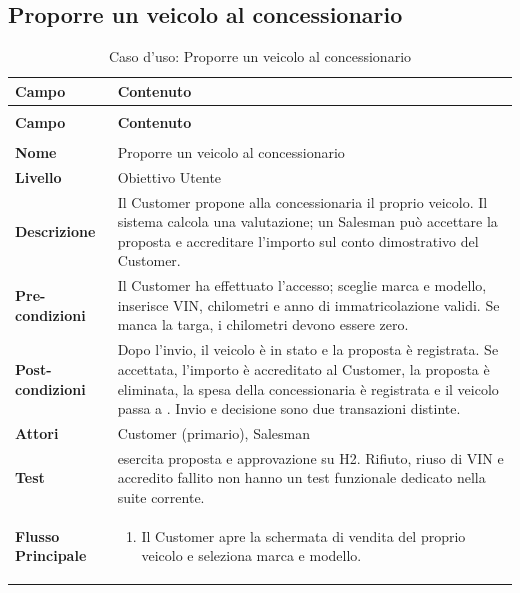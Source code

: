 \subsection{Proporre un veicolo al concessionario}\label{sec:uc-cessione}
\begin{xltabular}{\textwidth}{| >{\bfseries}p{.22\textwidth} | >{\raggedright\arraybackslash}X |}
\caption{Caso d'uso: Proporre un veicolo al concessionario}\label{tab:uc-cessione}\\
\hline
{} Campo & \textbf{Contenuto}\\\hline
\endfirsthead
{}\\
\hline
{} Campo & \textbf{Contenuto}\\\hline
\endhead
\hline
{}\\
\endfoot
\endlastfoot
Nome & Proporre un veicolo al concessionario\\\hline
Livello & Obiettivo Utente\\\hline
Descrizione & Il Customer propone alla concessionaria il proprio veicolo. Il sistema calcola una valutazione; un Salesman può accettare la proposta e accreditare l'importo sul conto dimostrativo del Customer.\\\hline
Pre-condizioni & Il Customer ha effettuato l'accesso; sceglie marca e modello, inserisce VIN, chilometri e anno di immatricolazione validi. Se manca la targa, i chilometri devono essere zero.\\\hline
Post-condizioni & Dopo l'invio, il veicolo è in stato  e la proposta è registrata. Se accettata, l'importo è accreditato al Customer, la proposta è eliminata, la spesa della concessionaria è registrata e il veicolo passa a . Invio e decisione sono due transazioni distinte.\\\hline
Attori & Customer (primario), Salesman\\\hline
Test &  esercita proposta e approvazione su H2. Rifiuto, riuso di VIN  e accredito fallito non hanno un test funzionale dedicato nella suite corrente.\\\hline
Flusso Principale &
\begin{enumerate}[label=\arabic*.,start=1,leftmargin=*,nosep]
  \item Il Customer apre la schermata di vendita del proprio veicolo e seleziona marca e modello.

\end{enumerate}
\end{xltabular}
